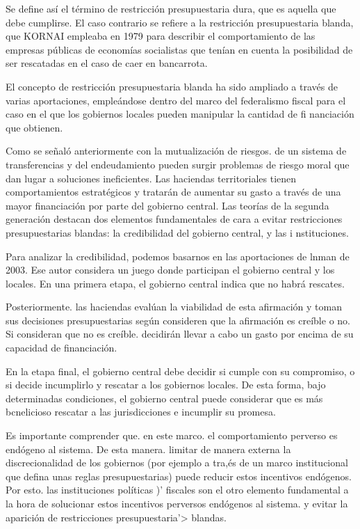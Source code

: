 \documentclass[10pt,a4paper]{article}
\begin{document}
Se define así el término de restricción presupuestaria dura, que es aquella que debe cumplirse. El caso contrario se refiere a la restricción presupuestaria blanda, que KORNAI empleaba en 1979 para describir el comportamiento de las empresas públicas de economías socialistas que tenían en cuenta la posibilidad de ser rescatadas en el caso de caer en bancarrota.

El concepto de restricción presupuestaria blanda ha sido ampliado a través de varias aportaciones, empleándose dentro del marco del federalismo fiscal para el caso en el que los gobiernos locales pueden manipular la cantidad de fi nanciación que obtienen.  

Como se señaló anteriormente con la mutualización de riesgos. de un sistema de transferencias y del endeudamiento pueden surgir problemas de riesgo moral que dan lugar a soluciones ineficientes. Las haciendas territoriales tienen comportamientos estratégicos y tratarán de aumentar su gasto a través de una mayor financiación por parte del gobierno central. Las teorías de la segunda generación destacan dos elementos fundamentales de cara a evitar restricciones presupuestarias blandas: la credibilidad del gobierno central, y las i nstituciones.

Para analizar la credibilidad, podemos basarnos en las aportaciones de lnman de 2003. Ese autor considera un juego donde participan el gobierno central y los locales. En una primera etapa, el gobierno central indica que no habrá rescates.

Posteriormente. las haciendas evalúan la viabilidad de esta afirmación y toman sus decisiones presupuestarias según consideren que la afirmación es creíble o no. Si consideran que no es creíble. decidirán llevar a cabo un gasto por encima de su capacidad de financiación.

En la etapa final, el gobierno central debe decidir si cumple con su compromiso, o si decide incumplirlo y rescatar a los gobiernos locales. De esta forma, bajo determinadas condiciones, el gobierno central puede considerar que es más bcnelicioso rescatar a las jurisdicciones e incumplir su promesa.

Es importante comprender que. en este marco. el comportamiento perverso es endógeno al sistema. De esta manera. limitar de manera externa la discrecionalidad de los gobiernos (por ejemplo a tra,és de un marco institucional que defina unas reglas presupuestarias) puede reducir estos incentivos endógenos. Por esto. las instituciones políticas )' fiscales son el otro elemento fundamental a la hora de solucionar estos incentivos perversos endógenos al sistema. y evitar la aparición de restricciones presupuestaria'> blandas.
\end{document}
